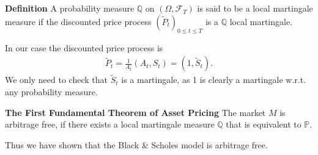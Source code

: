 \documentclass{beamer}
\numberwithin{equation}{section}
\newenvironment{frame2}{\begin{frame}\frametitle{{\normalsize \secname} \\ {\large \subsecname}}}{\end{frame}}
\begin{document}
\begin{frame2}
    \textbf{Definition}\newline
    A probability measure $\mathbb{Q}$ on $(\Omega,\mathscr{F}_T)$ is said to be a local martingale measure if the discounted price process $(\tilde{P}_t)_{0\leq t \leq T}$ is a $\mathbb{Q}$ local martingale.
    \vspace{10pt}

    In our case the discounted price process is
    \begin{align*}
        \tilde{P}_t = \frac{1}{A_t}\left(A_t, S_t\right) = \left(1, \tilde{S}_t\right).
    \end{align*}
    \begingroup
    \footnotesize
    \color{gray}
    We only need to check that $\tilde{S}_t$ is a martingale, as 1 is clearly a martingale w.r.t.\! any probability measure.
    \endgroup

    \textbf{The First Fundamental Theorem of Asset Pricing}\newline
    The market $M$ is arbitrage free, if there exists a local martingale measure $\mathbb{Q}$ that is equivalent to $\mathbb{P}$.

    \vspace{10pt}
    Thus we have shown that the Black \& Scholes model is arbitrage free.
\end{frame2}

\end{document}
